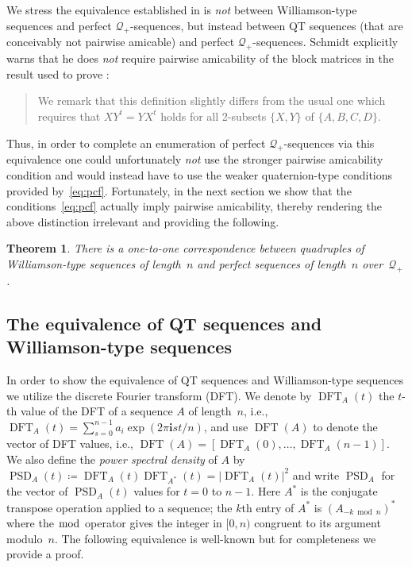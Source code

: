 \documentclass[12pt]{article}
\numberwithin{equation}{section}
\newtheorem{theorem}{Theorem}
\newcommand{\qi}{\mathbf{i}}
\newcommand{\Q}{\mathcal{Q}}
\DeclareMathOperator{\PSD}{PSD}
\DeclareMathOperator{\DFT}{DFT}
\begin{document}
We stress the equivalence established in  is \emph{not} between Williamson-type sequences and perfect $\Q_+$-sequences, but instead
between QT sequences (that are conceivably not pairwise amicable) and perfect $\Q_+$-sequences.
Schmidt explicitly warns that he does \emph{not}
require pairwise amicability of the block matrices in the result
used to prove :
\begin{quote}
We remark that this definition slightly differs from the usual one which requires that $XY^t = Y X^t$ holds for all
2-subsets $\{X, Y\}$ of $\{A, B, C, D\}$.~\cite{Schmidt1999}
\end{quote}
Thus, in order to complete an enumeration of perfect $\Q_+$-sequences via this equivalence one could unfortunately
\emph{not} use the stronger pairwise amicability condition
and would instead have to use the weaker quaternion-type conditions provided by~\eqref{eq:pcf}.
Fortunately, in the next section we show that the conditions~\eqref{eq:pcf} actually imply pairwise amicability,
thereby rendering the above distinction irrelevant and providing the following.
\begin{theorem}
There is a one-to-one correspondence between quadruples of Williamson-type sequences of length\/~$n$ and perfect sequences of length\/~$n$ over\/~$\Q_+$.
\end{theorem}

\subsection{The equivalence of QT sequences and Williamson-type sequences}\label{sec:qt-wt-equiv}

In order to show the equivalence of QT sequences and Williamson-type sequences we utilize the discrete Fourier transform (DFT)\@.
We denote by $\DFT_A(t)$ the $t$-th value of the DFT of a sequence $A$ of length~$n$,
i.e., $\DFT_A(t)=\sum_{s=0}^{n-1}a_i\exp(2\pi \qi st/n)$, and use
$\DFT(A)$ to denote the vector of DFT values, i.e., $\DFT(A)=[\DFT_A(0),\dotsc,\DFT_A(n-1)]$.
We also define the \emph{power spectral density} of $A$ by $\PSD_A(t) \coloneqq \DFT_A(t)\DFT_{A^*}(t) = \lvert\DFT_A(t)\rvert^2$
and write $\PSD_A$ for the vector of $\PSD_A(t)$ values for $t=0$ to $n-1$.
Here $A^*$ is the conjugate transpose operation applied to a sequence; the $k$th entry
of $A^*$ is $(A_{-k\bmod n})^*$ where the $\bmod$ operator gives the integer in $[0,n)$
congruent to its argument modulo~$n$.  The following equivalence is well-known
but for completeness we provide a proof.
\end{document}
